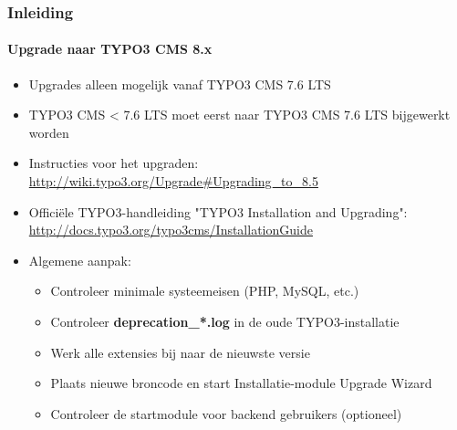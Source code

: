 \begin{frame}[fragile]
	\frametitle{Inleiding}
	\framesubtitle{Upgrade naar TYPO3 CMS 8.x}

	\begin{itemize}
		\item Upgrades alleen mogelijk vanaf TYPO3 CMS 7.6 LTS
		\item TYPO3 CMS < 7.6 LTS moet eerst naar TYPO3 CMS 7.6 LTS bijgewerkt worden
	\end{itemize}

	\begin{itemize}

		\item Instructies voor het upgraden:\newline
			\smaller\url{http://wiki.typo3.org/Upgrade#Upgrading_to_8.5}\normalsize
		\item Officiële TYPO3-handleiding "TYPO3 Installation and Upgrading":
			\smaller\url{http://docs.typo3.org/typo3cms/InstallationGuide}\normalsize
		\item Algemene aanpak:
			\begin{itemize}
				\item Controleer minimale systeemeisen \small(PHP, MySQL, etc.)
				\item Controleer \textbf{deprecation\_*.log} in de oude TYPO3-installatie
				\item Werk alle extensies bij naar de nieuwste versie
				\item Plaats nieuwe broncode en start Installatie-module \textrightarrow Upgrade Wizard
				\item Controleer de startmodule voor backend gebruikers (optioneel)
			\end{itemize}
	\end{itemize}

\end{frame}


